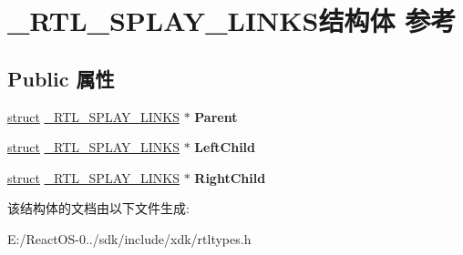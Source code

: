 \hypertarget{struct___r_t_l___s_p_l_a_y___l_i_n_k_s}{}\section{\+\_\+\+R\+T\+L\+\_\+\+S\+P\+L\+A\+Y\+\_\+\+L\+I\+N\+K\+S结构体 参考}
\label{struct___r_t_l___s_p_l_a_y___l_i_n_k_s}
\subsection*{Public 属性}
\begin{DoxyCompactItemize}
\item 
\mbox{\label{struct___r_t_l___s_p_l_a_y___l_i_n_k_s_a47874ac9bb998783166e100d95981812}} 
\hyperlink{interfacestruct}{struct} \hyperlink{struct___r_t_l___s_p_l_a_y___l_i_n_k_s}{\+\_\+\+R\+T\+L\+\_\+\+S\+P\+L\+A\+Y\+\_\+\+L\+I\+N\+KS} $\ast$ {\bfseries Parent}
\item 
\mbox{\label{struct___r_t_l___s_p_l_a_y___l_i_n_k_s_a45589b0b4319a362cf57d447b342cfd5}} 
\hyperlink{interfacestruct}{struct} \hyperlink{struct___r_t_l___s_p_l_a_y___l_i_n_k_s}{\+\_\+\+R\+T\+L\+\_\+\+S\+P\+L\+A\+Y\+\_\+\+L\+I\+N\+KS} $\ast$ {\bfseries Left\+Child}
\item 
\mbox{\label{struct___r_t_l___s_p_l_a_y___l_i_n_k_s_a854ccd0b4ae1ec7eaa1c279976850a16}} 
\hyperlink{interfacestruct}{struct} \hyperlink{struct___r_t_l___s_p_l_a_y___l_i_n_k_s}{\+\_\+\+R\+T\+L\+\_\+\+S\+P\+L\+A\+Y\+\_\+\+L\+I\+N\+KS} $\ast$ {\bfseries Right\+Child}
\end{DoxyCompactItemize}


该结构体的文档由以下文件生成\+:\begin{DoxyCompactItemize}
\item 
E\+:/\+React\+O\+S-\/0../sdk/include/xdk/rtltypes.\+h\end{DoxyCompactItemize}

